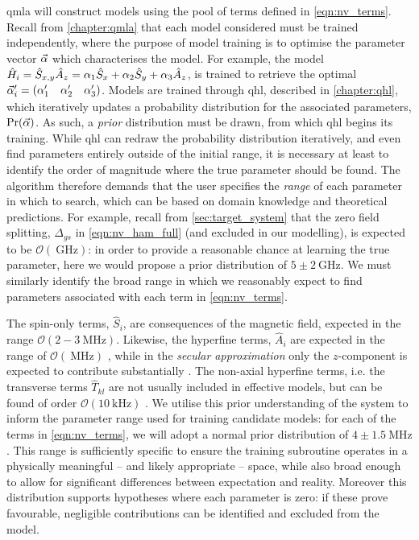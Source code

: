 \gls{qmla} will construct models using the pool of terms defined in \cref{eqn:nv_terms}. 
Recall from \cref{chapter:qmla} that each model considered must be trained independently, 
    where the purpose of model training is to optimise the parameter vector $\vec{\alpha}$ which characterises the model. 
For example, the model 
    $\hat{H}_i = \hat{S}_{x,y} \hat{A}_{z} = \alpha_1 \hat{S}_x  + \alpha_2 \hat{S}_y + \alpha_3 \hat{A}_z$,
    is trained to retrieve the optimal $\vec{\alpha}^{\prime}_i = \begin{matrix}(\alpha_1^{\prime} & \alpha_2^{\prime} & \alpha_3^{\prime})\end{matrix}$. 
Models are trained through \gls{qhl}, described in \cref{chapter:qhl}, 
    which iteratively updates a probability distribution for the associated parameters, $\Pr(\vec{\alpha})$. 
As such, a \emph{prior} distribution must be drawn, from which \gls{qhl} begins its training. 
While \gls{qhl} can redraw the probability distribution iteratively, and even find parameters entirely outside of the initial range, 
    it is necessary at least to identify the order of magnitude where the true parameter should be found. 
The algorithm therefore demands that the user specifies the \emph{range} of each parameter in which to search, 
    which can be based on domain knowledge and theoretical predictions. 
For example, recall from \cref{sec:target_system} that the zero field splitting, $\Delta_{gs}$ in \cref{eqn:nv_ham_full} (and excluded in our modelling),
    is expected to be $\mathcal{O}\left( \SI{}{\giga\hertz}\right)$: in order to provide a reasonable chance at learning the true parameter,
    here we would propose a prior distribution of $5 \pm 2 \SI{}{\giga\hertz}$.
We must similarly identify the broad range in which we reasonably expect to find parameters associated with each term in \cref{eqn:nv_terms}.
\par

The spin-only terms, $\hat{S}_i$, are consequences of the magnetic field, 
    expected in the range $\mathcal{O}\left(2-3\SI{}{\mega\hertz}\right)$.
Likewise, the hyperfine terms, $\hat{A}_i$ are expected in the range of $\mathcal{O}\left( \SI{}{\mega\hertz}\right)$ \cite{gali2008ab}, 
    while in the \emph{secular approximation} only the $z$-component is expected to contribute substantially \cite{dutt2007quantum}. 
The non-axial hyperfine terms, i.e. the transverse terms $\hat{T}_{kl}$ are not usually included in effective models, 
    but can be found of order $\mathcal{O}(\SI{10}{\kilo\hertz})$ \cite{hou2019experimental}. 
We utilise this prior understanding of the system to inform the parameter range used for training candidate models:
    for each of the terms in \cref{eqn:nv_terms}, we will adopt a normal prior distribution of $4 \pm 1.5\SI{}{\mega\hertz}$. 
This range is sufficiently specific to ensure the training subroutine operates in a physically meaningful -- 
    and likely appropriate -- space, while also broad enough to allow for significant differences between expectation and reality.
Moreover this distribution supports hypotheses where each parameter is zero:
    if these prove favourable, negligible contributions can be identified and excluded from the model.

